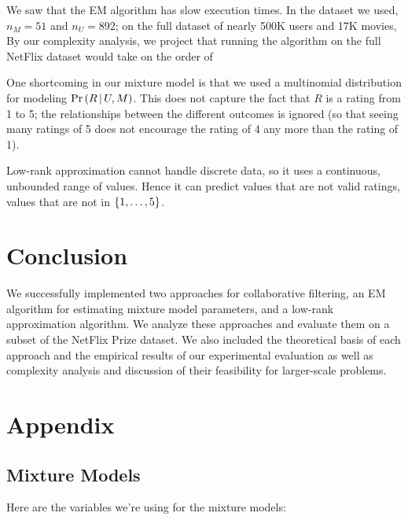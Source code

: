 \documentclass{article}
\begin{document}
We saw that the EM algorithm has slow execution times. In the dataset
we used, $n_M = 51$ and $n_U = 892$; on the full dataset of nearly
500K users and 17K movies, By our complexity analysis, we project that
running the algorithm on the full NetFlix dataset would take on the
order of \TODO{}

One shortcoming in our mixture model is that we used a multinomial
distribution for modeling ${{\Pr \left(  R \,\middle|\, U,M  \right)}}$. This does not capture the
fact that $R$ is a rating from 1 to 5; the relationships between the
different outcomes is ignored (so that seeing many ratings of 5 does
not encourage the rating of 4 any more than the rating of 1).

Low-rank approximation cannot handle discrete data, so it uses a
continuous, unbounded range of values. Hence it can predict values
that are not valid ratings, \ie values that are not in
${\left\{ 1, \dots, 5 \right\}}$.

\section{Conclusion}


We successfully implemented two approaches for collaborative
filtering, an EM algorithm for estimating mixture model parameters,
and a low-rank approximation algorithm.  We analyze these approaches
and evaluate them on a subset of the NetFlix Prize dataset. We also
included the theoretical basis of each approach and the empirical
results of our experimental evaluation as well as complexity analysis
and discussion of their feasibility for larger-scale problems.

\section{Appendix}

\subsection{Mixture Models}
\label{sec:appendix-mixture}

Here are the variables we're using for the mixture models:
\end{document}
